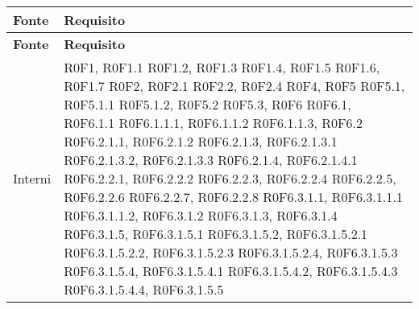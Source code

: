 \def\arraystretch{1.5}
\begin{longtable}{p{2.5cm}!{\VRule[1pt]}p{5.5cm}}
\color{white} \textbf{Fonte} & \color{white} \textbf{Requisito} \\ 
\endfirsthead 
{} 
\color{white} \textbf{Fonte} & \color{white} \textbf{Requisito} \\ 
\endhead 
Interni & R0F1, R0F1.1 \newline
R0F1.2, R0F1.3 \newline
R0F1.4, R0F1.5 \newline
R0F1.6, R0F1.7 \newline
R0F2, R0F2.1 \newline
R0F2.2, R0F2.4 \newline
R0F4, R0F5 \newline
R0F5.1, R0F5.1.1 \newline
R0F5.1.2, R0F5.2 \newline
R0F5.3, R0F6 \newline
R0F6.1, R0F6.1.1 \newline
R0F6.1.1.1, R0F6.1.1.2 \newline
R0F6.1.1.3, R0F6.2 \newline
R0F6.2.1.1, R0F6.2.1.2 \newline
R0F6.2.1.3, R0F6.2.1.3.1 \newline
R0F6.2.1.3.2, R0F6.2.1.3.3 \newline
R0F6.2.1.4, R0F6.2.1.4.1 \newline
R0F6.2.2.1, R0F6.2.2.2 \newline
R0F6.2.2.3, R0F6.2.2.4 \newline
R0F6.2.2.5, R0F6.2.2.6 \newline
R0F6.2.2.7, R0F6.2.2.8 \newline
R0F6.3.1.1, R0F6.3.1.1.1 \newline
R0F6.3.1.1.2, R0F6.3.1.2 \newline
R0F6.3.1.3, R0F6.3.1.4 \newline
R0F6.3.1.5, R0F6.3.1.5.1 \newline
R0F6.3.1.5.2, R0F6.3.1.5.2.1 \newline
R0F6.3.1.5.2.2, R0F6.3.1.5.2.3 \newline
R0F6.3.1.5.2.4, R0F6.3.1.5.3 \newline
R0F6.3.1.5.4, R0F6.3.1.5.4.1 \newline
R0F6.3.1.5.4.2, R0F6.3.1.5.4.3 \newline
R0F6.3.1.5.4.4, R0F6.3.1.5.5 \newline

\end{longtable}

